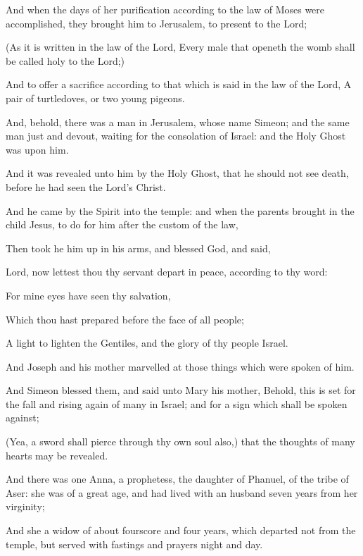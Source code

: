 {And
when the
days
of
her
purification according
to the
law of
Moses were
accomplished, they
brought
him
to
Jerusalem, to
present
{} to the
Lord;

(As it is
written
in the
law of the
Lord,
Every
male that
openeth the
womb shall be
called
holy to the
Lord;)

And to
offer a
sacrifice according
to that which is
said
in the
law of the
Lord, A
pair of
turtledoves,
or
two
young
pigeons.

And,
behold, there
was a
man
in
Jerusalem,
whose
name
{}
Simeon;
and the
same
man
{}
just
and
devout,
waiting for the
consolation of
Israel:
and
the
Holy
Ghost
was
upon
him.

And it
was
revealed unto
him
by
the
Holy
Ghost, that he
should
not
see
death,
before he had
seen
the
Lord’s
Christ.

And he
came
by the
Spirit
into the
temple:
and
when the
parents brought
in the
child
Jesus, to
do
for
him
after the
custom of the
law,

Then
took
he
him
up
in
his
arms,
and
blessed
God,
and
said,

Lord,
now lettest
thou
thy
servant
depart
in
peace, according
to
thy
word:

For
mine
eyes have
seen
thy
salvation,

Which thou hast
prepared
before the
face of
all
people;

A
light
to
lighten the
Gentiles,
and the
glory
of
thy
people
Israel.

And
Joseph
and
his
mother
marvelled
at those things which were
spoken
of
him.

And
Simeon
blessed
them,
and
said
unto
Mary
his
mother,
Behold,
this
{} is
set
for the
fall
and rising
again of
many
in
Israel;
and
for a
sign which shall be spoken
against;

(Yea, a
sword shall pierce
through
thy
own
soul
also,)
that the
thoughts
of
many
hearts may be
revealed.

And there
was one
Anna, a
prophetess, the
daughter of
Phanuel,
of the
tribe of
Aser:
she was
of a
great
age, and had
lived
with an
husband
seven
years
from
her
virginity;

And
she
{} a
widow of
about fourscore and
four
years,
which
departed
not
from the
temple, but
served
{} with
fastings
and
prayers
night
and
day.

}

